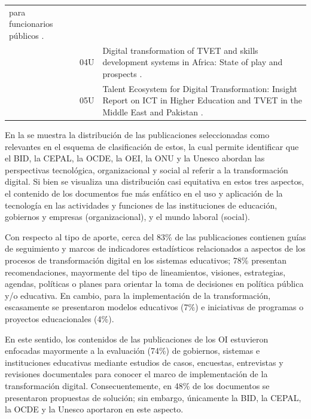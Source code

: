 \begin{table}[htpb]
\begin{tabular}{ll >{\raggedright\arraybackslash}p{}}
        para funcionarios públicos \cite{balbo}. \\
        & 04U & Digital transformation of TVET and skills development systems in
        Africa: State of play and prospects \cite{unesco2022}. \\
        & 05U & Talent Ecosystem for Digital Transformation: Insight Report on
        ICT in Higher Education and TVET in the Middle East and Pakistan
        \cite{knyazeva2022talent}. \\
      \bottomrule
    \end{tabular}
\end{table}

En la se muestra la distribución de las publicaciones
seleccionadas como relevantes en el esquema de clasificación de estos,
la cual permite identificar que el BID, la CEPAL, la OCDE, la OEI, la
ONU y la Unesco abordan las perspectivas tecnológica, organizacional y
social al referir a la transformación digital. Si bien se visualiza una
distribución casi equitativa en estos tres aspectos, el contenido de los
documentos fue más enfático en el uso y aplicación de la tecnología en
las actividades y funciones de las instituciones de educación, gobiernos
y empresas (organizacional), y el mundo laboral (social).

Con respecto al tipo de aporte, cerca del 83\% de las publicaciones
contienen guías de seguimiento y marcos de indicadores estadísticos
relacionados a aspectos de los procesos de transformación digital en los
sistemas educativos; 78\% presentan recomendaciones, mayormente del tipo
de lineamientos, visiones, estrategias, agendas, políticas o planes para
orientar la toma de decisiones en política pública y/o educativa. En
cambio, para la implementación de la transformación, escasamente se
presentaron modelos educativos (7\%) e iniciativas de programas o
proyectos educacionales (4\%).

En este sentido, los contenidos de las publicaciones de los OI
estuvieron enfocadas mayormente a la evaluación (74\%) de gobiernos,
sistemas e instituciones educativas mediante estudios de casos,
encuestas, entrevistas y revisiones documentales para conocer el marco
de implementación de la transformación digital. Consecuentemente, en
48\% de los documentos se presentaron propuestas de solución; sin
embargo, únicamente la BID, la CEPAL, la OCDE y la Unesco aportaron en
este aspecto.

